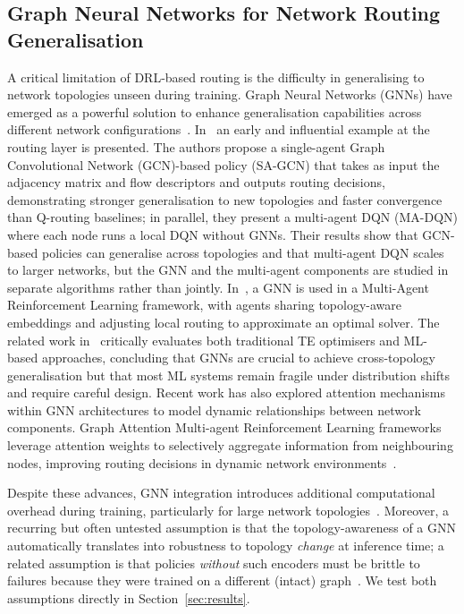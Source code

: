 \documentclass[10pt,journal,comsoc]{IEEEtran}
\begin{document}
\subsection{Graph Neural Networks for Network Routing Generalisation}
A critical limitation of DRL-based routing is the difficulty in generalising to network topologies unseen during training. Graph Neural Networks (GNNs) have emerged as a powerful solution to enhance generalisation capabilities across different network configurations~\cite{he2023routing,xiao2021leveraging}. In~\cite{bhavanasi2022routing} an early and influential example at the routing layer is presented. The authors propose a single-agent Graph Convolutional Network (GCN)-based policy (SA-GCN) that takes as input the adjacency matrix and flow descriptors and outputs routing decisions, demonstrating stronger generalisation to new topologies and faster convergence than Q-routing baselines; in parallel, they present a multi-agent DQN (MA-DQN) where each node runs a local DQN without GNNs. Their results show that GCN-based policies can generalise across topologies and that multi-agent DQN scales to larger networks, but the GNN and the multi-agent components are studied in separate algorithms rather than jointly. In~\cite{bernardez2023magnneto}, a GNN is used in a Multi-Agent Reinforcement Learning framework, with agents sharing topology-aware embeddings and adjusting local routing to approximate an optimal solver. The related work in~\cite{bernardez2021machine} critically evaluates both traditional TE optimisers and ML-based approaches, concluding that GNNs are crucial to achieve cross-topology generalisation but that most ML systems remain fragile under distribution shifts and require careful design. Recent work has also explored attention mechanisms within GNN architectures to model dynamic relationships between network components. Graph Attention Multi-agent Reinforcement Learning frameworks leverage attention weights to selectively aggregate information from neighbouring nodes, improving routing decisions in dynamic network environments~\cite{li2023gappo,ma2024routing}.

Despite these advances, GNN integration introduces additional computational overhead during training, particularly for large network topologies~\cite{ma2024routing}. Moreover, a recurring but often untested assumption is that the topology-awareness of a GNN automatically translates into robustness to topology \emph{change} at inference time; a related assumption is that policies \emph{without} such encoders must be brittle to failures because they were trained on a different (intact) graph~\cite{bhavanasi2022routing,bernardez2021machine}. We test both assumptions directly in Section~\ref{sec:results}.
\end{document}
